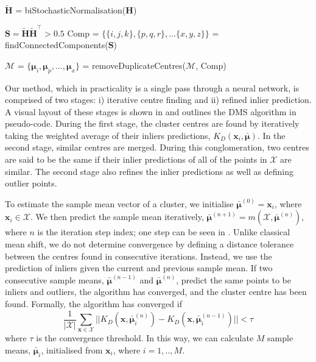 \documentclass[../thesis.tex]{subfiles}
\begin{document}
\begin{algorithm}
\begin{algorithmic}
\State $\tilde{\mathbf H}$ = biStochasticNormalisation($\mathbf H$) \cite{Coifman_2013}

\State $\mathbf S=\tilde{\mathbf H} \tilde{\mathbf H}^\top > 0.5$
\State Comp = $\{\{i,j,k\}, \{p,q,r\}, ...\{x,y,z\}\}$ = findConnectedComponents($\mathbf S$) \cite{Pearce2005AnIA}

\State $\mathcal{M}$ = $\{\boldsymbol{\mu}_i, \boldsymbol{\mu}_p, ..., \boldsymbol{\mu}_x\}$ = removeDuplicateCentres($\mathcal{M}$, Comp)
 \EndFunction

\end{algorithmic}
\end{algorithm}


Our method, which in practicality is a single pass through a neural network, is comprised of two stages: i) iterative centre finding and ii) refined inlier prediction. 
A visual layout of these stages is shown in  and  outlines the DMS algorithm in pseudo-code.
During the first stage, the cluster centres are found by iteratively taking the weighted average of their inliers predictions, $K_D(\mathbf x_i, \bar {\boldsymbol{\mu}})$. In the second stage, similar centres are merged. During this conglomeration, two centres are said to be the same if their inlier predictions of all of the points in $\mathcal X$ are similar. The second stage also refines the inlier predictions as well as defining outlier points.


    
To estimate the sample mean vector of a cluster, we initialise $\bar{\boldsymbol{\mu}}^{(0)} = \mathbf x_i$, where $\mathbf{x}_i \in \mathcal X$.   
We then predict the sample mean iteratively, $\bar{\boldsymbol{\mu}}^{(n+1)} = m(\mathcal X, \bar{\boldsymbol{\mu}}^{(n)})$, where $n$ is the iteration step index; one step can be seen in .
Unlike classical mean shift, we do not determine convergence by defining a distance tolerance between the centres found in consecutive iterations. Instead, we use the prediction of inliers given the current and previous sample mean. If two consecutive sample means, $\bar{\boldsymbol{\mu}}^{(n-1)}$ and  $\bar{\boldsymbol{\mu}}^{(n)}$, predict the same points to be inliers and outliers, the algorithm has converged, and the cluster centre has been found. 
Formally, the algorithm has converged if
    \begin{equation}\label{eq__DMS_convergence}
        \frac{1}{|\mathcal X|}\sum_{\mathbf x \in \mathcal X} ||K_D(\mathbf x, \bar{\boldsymbol{\mu}}^{(n)}_i) - K_D(\mathbf x, \bar{\boldsymbol{\mu}}^{(n-1)}_i)|| < \tau
    \end{equation}
where $\tau$ is the convergence threshold.
In this way, we can calculate $M$ sample means, $\bar{\boldsymbol{\mu}}_i$, initialised from $\mathbf{x}_i$, where $i=1,..,M$.
\end{document}
